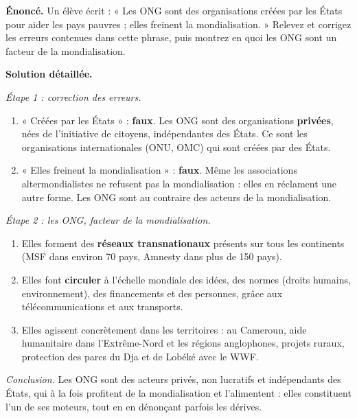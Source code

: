 \documentclass[11pt]{article}
\begin{document}
\begin{exoresolu}
\textbf{Énoncé.} Un élève écrit : « Les ONG sont des organisations créées par les États pour aider les pays pauvres ; elles freinent la mondialisation. » Relevez et corrigez les erreurs contenues dans cette phrase, puis montrez en quoi les ONG sont un facteur de la mondialisation.

\tcblower
\textbf{Solution détaillée.}

\emph{Étape 1 : correction des erreurs.}
\begin{enumerate}
\item « Créées par les États » : \textbf{faux}. Les ONG sont des organisations \textbf{privées}, nées de l'initiative de citoyens, indépendantes des États. Ce sont les organisations internationales (ONU, OMC) qui sont créées par des États.
\item « Elles freinent la mondialisation » : \textbf{faux}. Même les associations altermondialistes ne refusent pas la mondialisation : elles en réclament une autre forme. Les ONG sont au contraire des acteurs de la mondialisation.
\end{enumerate}

\emph{Étape 2 : les ONG, facteur de la mondialisation.}
\begin{enumerate}
\item Elles forment des \textbf{réseaux transnationaux} présents sur tous les continents (MSF dans environ 70 pays, Amnesty dans plus de 150 pays).
\item Elles font \textbf{circuler} à l'échelle mondiale des idées, des normes (droits humains, environnement), des financements et des personnes, grâce aux télécommunications et aux transports.
\item Elles agissent concrètement dans les territoires : au Cameroun, aide humanitaire dans l'Extrême-Nord et les régions anglophones, projets ruraux, protection des parcs du Dja et de Lobéké avec le WWF.
\end{enumerate}

\emph{Conclusion.} Les ONG sont des acteurs privés, non lucratifs et indépendants des États, qui à la fois profitent de la mondialisation et l'alimentent : elles constituent l'un de ses moteurs, tout en en dénonçant parfois les dérives.
\end{exoresolu}
\end{document}
